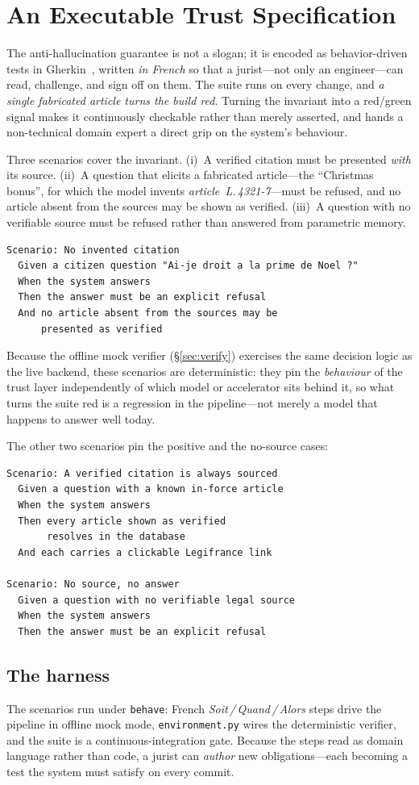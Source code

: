 \section{An Executable Trust Specification}
\label{sec:bdd}

The anti-hallucination guarantee is not a slogan; it is encoded as
behavior-driven tests in Gherkin~\cite{gherkin}, written \emph{in French} so
that a jurist---not only an engineer---can read, challenge, and sign off on
them. The suite runs on every change, and \emph{a single fabricated article
turns the build red}. Turning the invariant into a red/green signal makes it
continuously checkable rather than merely asserted, and hands a non-technical
domain expert a direct grip on the system's behaviour.

Three scenarios cover the invariant. (i)~A verified citation must be presented
\emph{with} its source. (ii)~A question that elicits a fabricated
article---the ``Christmas bonus'', for which the model invents
\emph{article~L.\,4321-7}---must be refused, and no article absent from the
sources may be shown as verified. (iii)~A question with no verifiable source
must be refused rather than answered from parametric memory.

\begin{lstlisting}[style=lr]
Scenario: No invented citation
  Given a citizen question "Ai-je droit a la prime de Noel ?"
  When the system answers
  Then the answer must be an explicit refusal
  And no article absent from the sources may be
      presented as verified
\end{lstlisting}

Because the offline mock verifier (\S\ref{sec:verify}) exercises the same
decision logic as the live backend, these scenarios are deterministic: they
pin the \emph{behaviour} of the trust layer independently of which model or
accelerator sits behind it, so what turns the suite red is a regression in the
pipeline---not merely a model that happens to answer well today.

The other two scenarios pin the positive and the no-source cases:

\begin{lstlisting}[style=lr]
Scenario: A verified citation is always sourced
  Given a question with a known in-force article
  When the system answers
  Then every article shown as verified
       resolves in the database
  And each carries a clickable Legifrance link

Scenario: No source, no answer
  Given a question with no verifiable legal source
  When the system answers
  Then the answer must be an explicit refusal
\end{lstlisting}

\subsection{The harness}
The scenarios run under \texttt{behave}: French \emph{Soit\,/\,Quand\,/\,Alors}
steps drive the pipeline in offline mock mode, \texttt{environment.py} wires
the deterministic verifier, and the suite is a continuous-integration gate.
Because the steps read as domain language rather than code, a jurist can
\emph{author} new obligations---each becoming a test the system must satisfy on
every commit.

